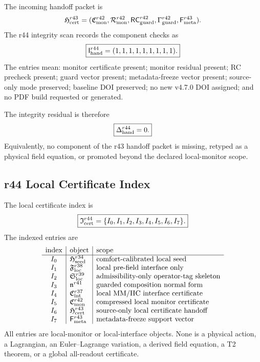 The incoming handoff packet is
\[
\mathfrak H_{\rm cert}^{r43}
=
(\mathfrak C_{\rm mon}^{r42},
\mathcal R_{\rm mon}^{r42},
\mathsf{RC}_{\rm guard}^{r42},
\Gamma_{\rm guard}^{r42},
\mathsf F_{\rm meta}^{r43}).
\]
The r44 integrity scan records the component checks as
\[
\boxed{
\mathsf I_{\rm hand}^{r44}
=(1,1,1,1,1,1,1,1,1).
}
\]
The entries mean: monitor certificate present; monitor residual present; RC
precheck present; guard vector present; metadata-freeze vector present;
source-only mode preserved; baseline DOI preserved; no new v4.7.0 DOI assigned;
and no PDF build requested or generated.

The integrity residual is therefore
\[
\boxed{
\Delta_{\rm hand}^{r44}=0.
}
\]
Equivalently, no component of the r43 handoff packet is missing, retyped as a
physical field equation, or promoted beyond the declared local-monitor scope.

\subsection{r44 Local Certificate Index}
\label{subsec:r44-local-certificate-index}

The local certificate index is
\[
\boxed{
\mathfrak I_{\rm cert}^{r44}
=
\{I_0,I_1,I_2,I_3,I_4,I_5,I_6,I_7\}.
}
\]
The indexed entries are
\[
\begin{array}{c|l|l}
\text{index} & \text{object} & \text{scope}\\
\hline
I_0 & \mathfrak H_{\rm seed}^{r34} & \text{comfort-calibrated local seed}\\
I_1 & \mathfrak F_{\rm loc}^{r38} & \text{local pre-field interface only}\\
I_2 & \mathfrak S_{\rm loc}^{r39} & \text{admissibility-only operator-tag skeleton}\\
I_3 & \mathfrak n^{r41} & \text{guarded composition normal form}\\
I_4 & \mathfrak C_{\rm int}^{r37} & \text{local MM/HC interface certificate}\\
I_5 & \mathfrak C_{\rm mon}^{r42} & \text{compressed local monitor certificate}\\
I_6 & \mathfrak H_{\rm cert}^{r43} & \text{source-only local certificate handoff}\\
I_7 & \mathsf F_{\rm meta}^{r43} & \text{metadata-freeze support vector}
\end{array}
\]
All entries are local-monitor or local-interface objects.  None is a physical
action, a Lagrangian, an Euler--Lagrange variation, a derived field equation, a
T2 theorem, or a global all-readout certificate.

